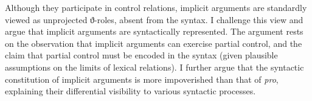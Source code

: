 Although they participate in control relations, implicit arguments are standardly viewed as unprojected ϑ-roles, absent from the syntax. I challenge this view and argue that implicit arguments are syntactically represented. The argument rests on the observation that implicit arguments can exercise partial control, and the claim that partial control must be encoded in the syntax (given plausible assumptions on the limits of lexical relations). I further argue that the syntactic constitution of implicit arguments is more impoverished than that of \textit{pro}, explaining their differential visibility to various syntactic processes.
\endinput